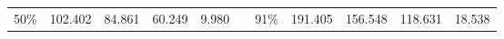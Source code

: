 \documentclass[12pt]{article}
\begin{document}
\begin{center}
\begin{tabular}{|c|r|r|r|r|r|c|r|r|r|r|}
    50\%                      & 102.402                            & 84.861                              & 60.249                              & 9.980                              &                                & 91\%                      & 191.405                            & 156.548                             & 118.631                             & 18.538                             \\ \cline{1-5} \cline{7-11} 
    \end{tabular}
  \label{tab:DriveTypeData}
\end{center}



\newpage


\end{document}
